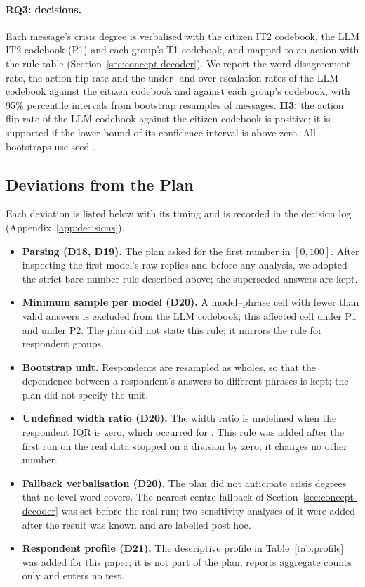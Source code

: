 \paragraph{RQ3: decisions.}
Each message's crisis degree is verbalised with the citizen IT2 codebook, the LLM IT2 codebook (P1) and each group's T1
codebook, and mapped to an action with the rule table (Section~\ref{sec:concept-decoder}).
We report the word disagreement rate, the action flip rate and the under- and over-escalation rates of the LLM codebook
against the citizen codebook and against each group's codebook, with 95\% percentile intervals from \WthreeBootB{}
bootstrap resamples of messages.
\textbf{H3:} the action flip rate of the LLM codebook against the citizen codebook is positive; it is supported if the
lower bound of its confidence interval is above zero.
All bootstraps use seed \WSeed{}.

\subsection{Deviations from the Plan}
\label{sec:design-deviations}

Each deviation is listed below with its timing and is recorded in the decision log (Appendix~\ref{app:decisions}).
\begin{itemize}
\item \textbf{Parsing (D18, D19).} The plan asked for the first number in $[0, 100]$. After inspecting the first model's
raw replies and before any analysis, we adopted the strict bare-number rule described above; the superseded answers are
kept.
\item \textbf{Minimum sample per model (D20).} A model--phrase cell with fewer than \WMinN{} valid answers is excluded
from the LLM codebook; this affected \WtwoExcludedCellsPOne{} cell under P1 and \WtwoExcludedCellsPTwo{} under P2. The
plan did not state this rule; it mirrors the rule for respondent groups.
\item \textbf{Bootstrap unit.} Respondents are resampled as wholes, so that the dependence between a respondent's
answers to different phrases is kept; the plan did not specify the unit.
\item \textbf{Undefined width ratio (D20).} The width ratio is undefined when the respondent IQR is zero, which occurred for
. This rule was added after the first run on the real data stopped on a division by zero; it changes no
other number.
\item \textbf{Fallback verbalisation (D20).} The plan did not anticipate crisis degrees that no level word covers. The
nearest-centre fallback of Section~\ref{sec:concept-decoder} was set before the real run; two sensitivity analyses of it
were added after the result was known and are labelled post hoc.
\item \textbf{Respondent profile (D21).} The descriptive profile in Table~\ref{tab:profile} was added for this paper; it
is not part of the plan, reports aggregate counts only and enters no test.
\end{itemize}
